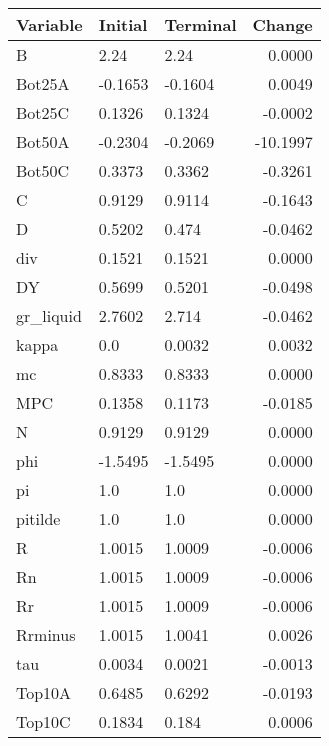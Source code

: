 \begin{table}
\centering
\label{tab:stst_comparison_low_B_wedge_permanent}
\begin{tabular}{lllr}
\toprule
                Variable & Initial & Terminal &   Change \\
\midrule
                       B &    2.24 &     2.24 &   0.0000 \\
                  Bot25A & -0.1653 &  -0.1604 &   0.0049 \\
                  Bot25C &  0.1326 &   0.1324 &  -0.0002 \\
                  Bot50A & -0.2304 &  -0.2069 & -10.1997 \\
                  Bot50C &  0.3373 &   0.3362 &  -0.3261 \\
                       C &  0.9129 &   0.9114 &  -0.1643 \\
                       D &  0.5202 &    0.474 &  -0.0462 \\
                     div &  0.1521 &   0.1521 &   0.0000 \\
                      DY &  0.5699 &   0.5201 &  -0.0498 \\
               gr\_liquid &  2.7602 &    2.714 &  -0.0462 \\
                   kappa &     0.0 &   0.0032 &   0.0032 \\
                      mc &  0.8333 &   0.8333 &   0.0000 \\
                     MPC &  0.1358 &   0.1173 &  -0.0185 \\
                       N &  0.9129 &   0.9129 &   0.0000 \\
                     phi & -1.5495 &  -1.5495 &   0.0000 \\
                      pi &     1.0 &      1.0 &   0.0000 \\
                 pitilde &     1.0 &      1.0 &   0.0000 \\
                       R &  1.0015 &   1.0009 &  -0.0006 \\
                      Rn &  1.0015 &   1.0009 &  -0.0006 \\
                      Rr &  1.0015 &   1.0009 &  -0.0006 \\
                 Rrminus &  1.0015 &   1.0041 &   0.0026 \\
                     tau &  0.0034 &   0.0021 &  -0.0013 \\
                  Top10A &  0.6485 &   0.6292 &  -0.0193 \\
                  Top10C &  0.1834 &    0.184 &   0.0006 \\

\end{tabular}
\end{table}
